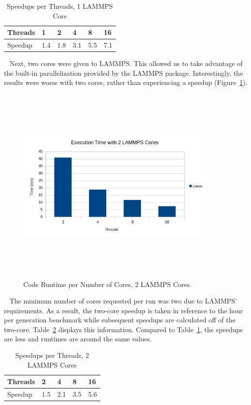 \documentclass[letterpaper, 12pt]{article}
\begin{document}
\begin{flushleft}
\begin{table}[ht]
	\centering
	\caption{Speedups per Threads, 1 LAMMPS Core}
	\label{speedups1core}
	\begin{tabular}{|l|l|l|l|l|l|}
		\hline
		Threads           	& 1  & 2 & 4 & 8 & 16					\\
		\hline
		Speedup 			& 1.4 & 1.8 & 3.1 & 5.5 & 7.1			\\ 
		\hline
	\end{tabular}
\end{table}

~\newline
Next, two cores were given to LAMMPS.  This allowed us to take advantage of the built-in parallelization provided by the LAMMPS package.  Interestingly, the results were worse with two cores, rather than experiencing a speedup (Figure~\ref{fig:runtimes2cores}).

\begin{figure}[H]
	\centering
	\includegraphics[width=10cm,height=10cm,keepaspectratio]{results2.png}
	\caption[Run Times per Core]{Code Runtime per Number of Cores, 2 LAMMPS Cores.}
	\label{fig:runtimes2cores}
\end{figure}

~\newline
The minimum number of cores requested per run was two due to LAMMPS' requirements. As a result, the two-core speedup is taken in reference to the hour per generation benchmark while subsequent speedups are calculated off of the two-core.  Table~\ref{speedups2core} displays this information.  Compared to Table~\ref{speedups1core}, the speedups are less and runtimes are around the same values.
\begin{table}[ht]
	\centering
	\caption{Speedups per Threads, 2 LAMMPS Cores}
	\label{speedups2core}
	\begin{tabular}{|l|l|l|l|l|}
		\hline
		Threads           	& 2 & 4 & 8 & 16					\\
		\hline
		Speedup 			& 1.5 & 2.1 & 3.5 & 5.6			\\ 
		\hline
	\end{tabular}
\end{table}


\end{flushleft}
\end{document}

